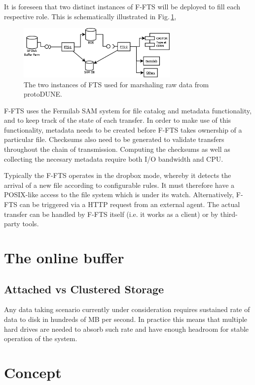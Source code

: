 \documentclass[pdftex,12pt,letter]{article}
\begin{document}
\noindent It is foreseen that two distinct instances of F-FTS will be deployed to fill each
respective role. This is schematically illustrated in Fig.\,\ref{fig:ftsinstances},

\begin{figure}[tbh]
  \centering
  \includegraphics[width=0.7\textwidth]{figures/ftsinstances_v2.png}
  \caption{The two instances of FTS used for marshaling raw data from protoDUNE.}
  \label{fig:ftsinstances}
\end{figure}

 \noindent F-FTS uses the Fermilab SAM system for file catalog and metadata functionality,
and to keep track of the state of each transfer. In order to make use of this functionality, metadata
needs to be created before F-FTS takes ownership of a particular file. Checksums also need to be
generated to validate transfers throughout the chain of transmission. Computing the checksums
as well as collecting the necesary metadata require both I/O bandwidth and CPU.

Typically the F-FTS operates in the dropbox mode, whereby it detects the arrival of a new file
according to configurable rules. It must therefore have a POSIX-like access to the file
system which is under its watch. Alternatively, F-FTS can be triggered via a HTTP request
from an external agent. The actual transfer can be handled by F-FTS itself (i.e. it works
as a client) or by third-party tools.

\section{The online buffer}
\subsection{Attached vs Clustered Storage}
Any data taking scenario currently under consideration requires sustained rate
of data to disk in hundreds of MB per second. In practice this means that
multiple hard drives are needed to absorb such rate and have enough headroom
for stable operation of the system.



\section{Concept}
\end{document}
